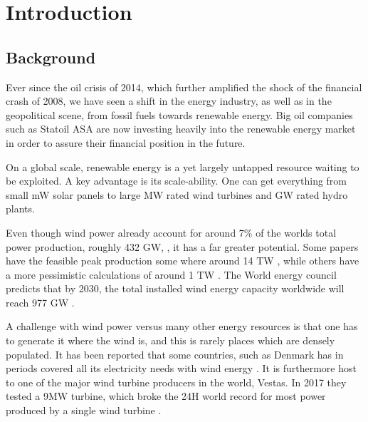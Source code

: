 \chapter{Introduction}
    

    
     
     
     \section{Background}
        Ever since the oil crisis of 2014, which further amplified the shock of the financial crash of 2008, we have seen a shift in the energy industry, as well as in the geopolitical scene, from fossil fuels towards renewable energy. Big oil companies such as Statoil ASA are now investing heavily into the renewable energy market in order to assure their financial position in the future.\cite{StatoilRenewable}
        
        On a global scale, renewable energy is a yet largely untapped resource waiting to be exploited. A key advantage is its scale-ability. One can get everything from small mW solar panels to  large  MW rated wind turbines and GW rated hydro plants.
        
        Even though wind power already account for around 7\% of the worlds total power production, roughly 432 GW, \cite{WorldEnergyR}, it has a far greater potential. Some papers have the feasible peak production some where around 14 TW \cite{lu2009global}, while others have a more pessimistic calculations of around 1 TW \cite{de2011global}. The World energy council predicts that by 2030, the total installed wind energy capacity worldwide will reach 977 GW \cite{WorldEnergyR}.
        
        A challenge with wind power versus many other energy resources is that one has to generate it where the wind is, and this is rarely places which are densely populated. It has been reported that some countries, such as Denmark has in periods covered all its electricity needs with wind energy \cite{GreenTech}. It is furthermore host to one of the major wind turbine producers in the world, Vestas. In 2017 they tested a 9MW turbine, which broke the 24H world record for most power produced by a single wind turbine \cite{GreenTech}.
        
    
